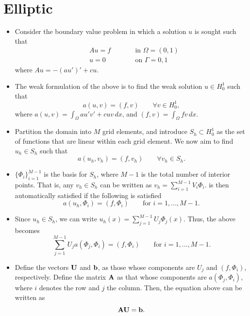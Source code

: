 \documentclass[oneside,a4paper,11pt]{report}
\begin{document}
\chapter{Elliptic}
\begin{itemize}
\item Consider the boundary value problem in which a solution $u$ is sought such that
\begin{equation}
    \begin{aligned}
        &Au = f \qquad &&\text{in } \Omega = (0,1) \\
        &u = 0 && \text{on } \Gamma = 0,1
    \end{aligned}
\end{equation}
where $Au = -(au')' + cu$.

\item The weak formulation of the above is to find the weak solution $u\in H^1_0$ such that 
\begin{equation}
\label{eq:weak_form}
    a(u,v) = (f,v)\qquad \forall v \in H^1_0 ,
\end{equation}
where $a(u,v) = \int_\Omega au'v'+cuv \, dx$, and $(f,v) = \int_\Omega fv \, dx$.

\item Partition the domain into $M$ grid elements, and introduce $S_h \subset H^1_0$ as the set of functions that are linear within each grid element. We now aim to find $u_h \in S_h$ such that
\begin{equation}
\label{eq:fe_elliptic_sh_solution}
    a(u_h,v_h) = (f,v_h)\qquad \forall v_h \in S_h.
\end{equation}

\item $\{\Phi_i\}_{i=1}^{M-1}$ is the basis for $S_h$, where $M-1$ is the total number of interior points. That is, any $v_h \in S_h$ can be written as $v_h = \sum_{i=1}^{M-1} V_i \Phi_i$.  is then automatically satisfied if the following is satisfied
\begin{equation}
    a(u_h, \Phi_i) = (f, \Phi_i) \qquad \text{for }i=1,...,M-1.
\end{equation}

\item Since $u_h \in S_h$, we can write $u_h(x) = \sum_{j=1}^{M-1} U_j \Phi_j(x)$. Thus, the above becomes
\begin{equation}
    \sum_{j=1}^{M-1} U_j a(\Phi_j,\Phi_i) = (f,\Phi_i) \qquad \text{for }i=1,...,M-1.
\end{equation}

\item Define the vectors $\mathbf{U}$ and $\mathbf{b}$, as those whose components are $U_j$ and $(f,\Phi_i)$, respectively. Define the matrix $\mathbf{A}$ as that whose components are $a(\Phi_j,\Phi_i)$, where $i$ denotes the row and $j$ the column. Then, the equation above can be written as
\begin{equation}
    \mathbf{A} \mathbf{U} = \mathbf{b}.
\end{equation}
\end{itemize} 
\end{document}
